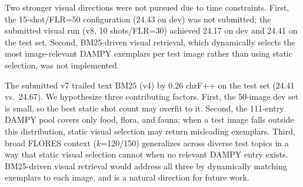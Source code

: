 \documentclass[11pt]{article}
\begin{document}
Two stronger visual directions were not pursued due to time constraints.
First, the 15-shot/FLR=50 configuration (24.43 on dev) was not submitted;
the submitted visual run (v8, 10 shots/FLR=30) achieved 24.17 on dev and
24.41 on the test set. Second, BM25-driven visual retrieval, which dynamically
selects the most image-relevant DAMPY exemplars per test image rather than
using static selection, was not implemented.

The submitted v7 trailed text BM25 (v4) by 0.26 chrF++ on the test set
(24.41 vs.\ 24.67). We hypothesize three contributing factors.
First, the 50-image dev set is small, so the best static shot count may
overfit to it. Second, the 111-entry DAMPY pool covers only food, flora, and
fauna; when a test image falls outside this distribution, static visual
selection may return misleading exemplars. Third, broad FLORES context
($k$=120/150) generalizes across diverse test topics in a way that static
visual selection cannot when no relevant DAMPY entry exists. BM25-driven
visual retrieval would address all three by dynamically matching exemplars
to each image, and is a natural direction for future work.
\end{document}
